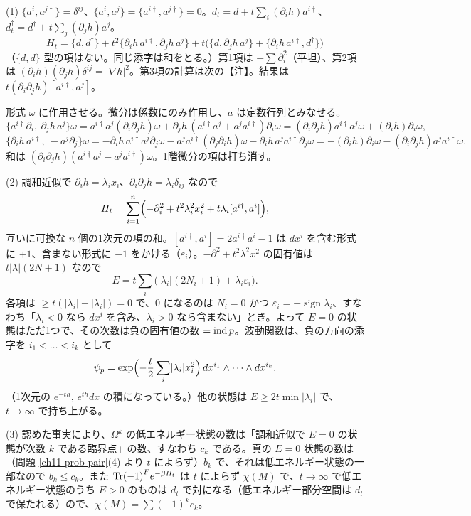 \begin{solution}
(1) $\{a^i,a^{j\dagger}\}=\delta^{ij}$、$\{a^i,a^j\}=\{a^{i\dagger},a^{j\dagger}\}=0$。$d_t=d+t\sum_i(\partial_ih)a^{i\dagger}$、$d_t^\dagger=d^\dagger+t\sum_j(\partial_jh)a^j$。
\[
H_t=\{d,d^\dagger\}+t^2\{\partial_ih\,a^{i\dagger},\partial_jh\,a^j\}+t\bigl(\{d,\partial_jh\,a^j\}+\{\partial_ih\,a^{i\dagger},d^\dagger\}\bigr)
\]
（$\{d,d\}$ 型の項はない。同じ添字は和をとる。）第1項は $-\sum\partial_i^2$（平坦）、第2項は $(\partial_ih)(\partial_jh)\delta^{ij}=\lvert\nabla h\rvert^2$。第3項の計算は次の【注】。結果は $t(\partial_i\partial_jh)[a^{i\dagger},a^j]$。
\begin{note}
形式 $\omega$ に作用させる。微分は係数にのみ作用し、$a$ は定数行列とみなせる。
\[
\{a^{i\dagger}\partial_i,\ \partial_jh\,a^j\}\omega=a^{i\dagger}a^j(\partial_i\partial_jh)\omega+\partial_jh\,(a^{i\dagger}a^j+a^ja^{i\dagger})\partial_i\omega=(\partial_i\partial_jh)a^{i\dagger}a^j\omega+(\partial_ih)\partial_i\omega,
\]
\[
\{\partial_ih\,a^{i\dagger},\ -a^j\partial_j\}\omega=-\partial_ih\,a^{i\dagger}a^j\partial_j\omega-a^ja^{i\dagger}(\partial_j\partial_ih)\omega-\partial_ih\,a^ja^{i\dagger}\partial_j\omega=-(\partial_ih)\partial_i\omega-(\partial_i\partial_jh)a^ja^{i\dagger}\omega .
\]
和は $(\partial_i\partial_jh)(a^{i\dagger}a^j-a^ja^{i\dagger})\omega$。1階微分の項は打ち消す。
\end{note}

(2) 調和近似で $\partial_ih=\lambda_ix_i$、$\partial_i\partial_jh=\lambda_i\delta_{ij}$ なので
\[
H_t=\sum_{i=1}^n\Bigl(-\partial_i^2+t^2\lambda_i^2x_i^2+t\lambda_i[a^{i\dagger},a^i]\Bigr),
\]
互いに可換な $n$ 個の1次元の項の和。$[a^{i\dagger},a^i]=2a^{i\dagger}a^i-1$ は $dx^i$ を含む形式に $+1$、含まない形式に $-1$ をかける（$\varepsilon_i$）。$-\partial^2+t^2\lambda^2x^2$ の固有値は $t\lvert\lambda\rvert(2N+1)$ なので
\[
E=t\sum_i\bigl(\lvert\lambda_i\rvert(2N_i+1)+\lambda_i\varepsilon_i\bigr).
\]
各項は $\ge t(\lvert\lambda_i\rvert-\lvert\lambda_i\rvert)=0$ で、$0$ になるのは $N_i=0$ かつ $\varepsilon_i=-\operatorname{sign}\lambda_i$、すなわち「$\lambda_i<0$ なら $dx^i$ を含み、$\lambda_i>0$ なら含まない」とき。よって $E=0$ の状態はただ1つで、その次数は負の固有値の数 $=\operatorname{ind} p$。波動関数は、負の方向の添字を $i_1<\dots<i_k$ として
\[
\psi_p=\exp\Bigl(-\frac t2\sum_i\lvert\lambda_i\rvert x_i^2\Bigr)\,dx^{i_1}\wedge\dots\wedge dx^{i_k}.
\]
（1次元の $e^{-th}$, $e^{th}dx$ の積になっている。）他の状態は $E\ge2t\min\lvert\lambda_i\rvert$ で、$t\to\infty$ で持ち上がる。

(3) 認めた事実により、$\Omega^k$ の低エネルギー状態の数は「調和近似で $E=0$ の状態が次数 $k$ である臨界点」の数、すなわち $c_k$ である。真の $E=0$ 状態の数は（問題 \ref{ch11-prob-pair}(4) より $t$ によらず）$b_k$ で、それは低エネルギー状態の一部なので $b_k\le c_k$。また $\Tr(-1)^Fe^{-\beta H_t}$ は $t$ によらず $\chi(M)$ で、$t\to\infty$ で低エネルギー状態のうち $E>0$ のものは $d_t$ で対になる（低エネルギー部分空間は $d_t$ で保たれる）ので、$\chi(M)=\sum(-1)^kc_k$。


\end{solution}
